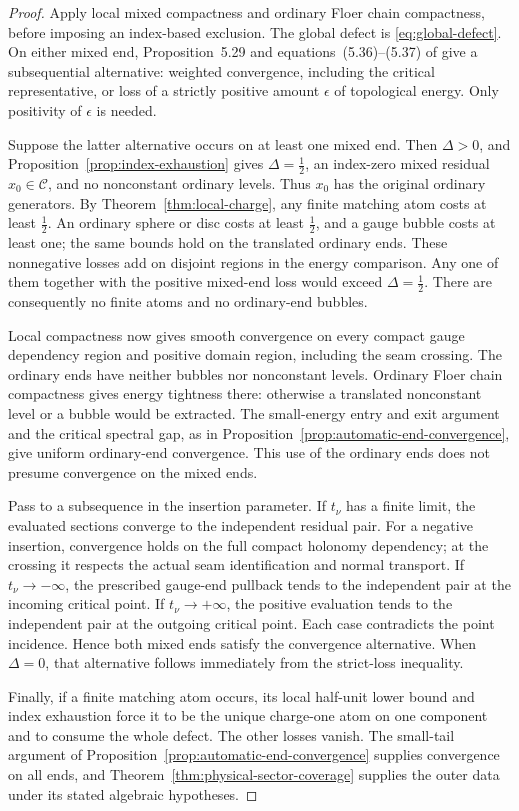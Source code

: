\documentclass[11pt]{amsart}
\theoremstyle{definition}
\theoremstyle{remark}
\theoremstyle{plain}
\begin{document}
\begin{proof}
Apply local mixed compactness and ordinary Floer chain
compactness, before imposing an index-based exclusion.
The global defect is \eqref{eq:global-defect}. On either
mixed end, Proposition~5.29 and equations~(5.36)--(5.37) of
\cite{DaeFukLip21a} give a subsequential alternative:
weighted convergence, including the critical representative,
or loss of a strictly positive amount $\epsilon$ of
topological energy. Only positivity of $\epsilon$ is needed.

Suppose the latter alternative occurs on at least one mixed
end. Then $\Delta>0$, and
Proposition~\ref{prop:index-exhaustion} gives
$\Delta=\frac12$, an index-zero mixed residual $x_0\in\mathcal C$,
and no nonconstant ordinary levels. Thus $x_0$ has the
original ordinary generators.
By Theorem~\ref{thm:local-charge}, any finite matching atom
costs at least $\frac12$. An ordinary sphere or disc costs
at least $\frac12$, and a gauge bubble costs at least one;
the same bounds hold on the translated ordinary ends.
These nonnegative losses add on disjoint regions in the
energy comparison. Any one of them together with the
positive mixed-end loss would exceed $\Delta=\frac12$.
There are consequently no finite atoms and no
ordinary-end bubbles.

Local compactness now gives smooth convergence on every
compact gauge dependency region and positive domain region,
including the seam crossing. The ordinary ends have neither
bubbles nor nonconstant levels. Ordinary Floer chain
compactness gives energy tightness there: otherwise a
translated nonconstant level or a bubble would be extracted.
The small-energy entry and exit argument and the critical
spectral gap, as in
Proposition~\ref{prop:automatic-end-convergence}, give uniform
ordinary-end convergence. This use of the ordinary ends
does not presume convergence on the mixed ends.

Pass to a subsequence in the insertion parameter.
If $t_\nu$ has a finite limit, the evaluated sections converge
to the independent residual pair. For a negative insertion,
convergence holds on the full compact holonomy dependency;
at the crossing it respects the actual seam identification
and normal transport. If $t_\nu\to-\infty$, the prescribed
gauge-end pullback tends to the independent pair at the
incoming critical point. If $t_\nu\to+\infty$, the positive
evaluation tends to the independent pair at the outgoing
critical point. Each case contradicts the point incidence.
Hence both mixed ends satisfy the convergence alternative.
When $\Delta=0$, that alternative follows immediately from
the strict-loss inequality.

Finally, if a finite matching atom occurs, its local half-unit
lower bound and index exhaustion force it to be the unique
charge-one atom on one component and to consume the whole
defect. The other losses vanish. The small-tail argument of
Proposition~\ref{prop:automatic-end-convergence} supplies
convergence on all ends, and
Theorem~\ref{thm:physical-sector-coverage} supplies the outer
data under its stated algebraic hypotheses.
\end{proof}
\end{document}
